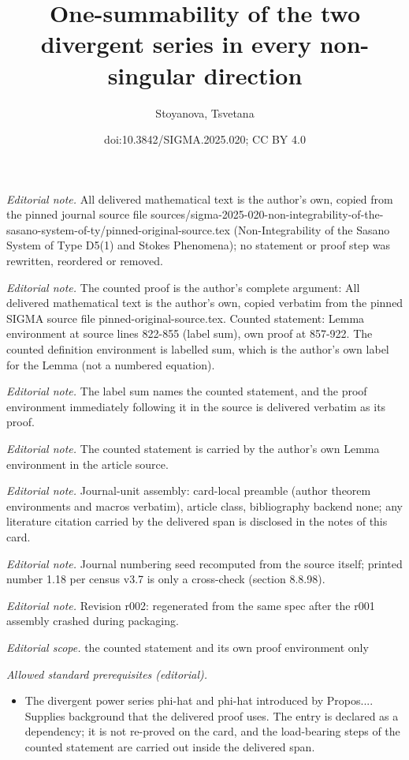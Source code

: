 \documentclass[10pt,a4paper]{article}
\title{One-summability of the two divergent series in every non-singular direction}
\author{Stoyanova, Tsvetana}
\date{doi:10.3842/SIGMA.2025.020; CC BY 4.0}
\numberwithin{equation}{section}
\begin{document}
\maketitle
\setcounter{section}{1}
\setcounter{Theorem}{17}
\noindent\textit{Editorial note.} All delivered mathematical text is the author's own, copied from the pinned journal source file sources/sigma-2025-020-non-integrability-of-the-sasano-system-of-ty/pinned-original-source.tex (Non-Integrability of the Sasano System of Type D5(1) and Stokes Phenomena); no statement or proof step was rewritten, reordered or removed.\par\medskip
\noindent\textit{Editorial note.} The counted proof is the author's complete argument: All delivered mathematical text is the author's own, copied verbatim from the pinned SIGMA source file pinned-original-source.tex. Counted statement: Lemma environment at source lines 822-855 (label sum), own proof at 857-922. The counted definition environment is labelled sum, which is the author's own label for the Lemma (not a numbered equation).\par\medskip
\noindent\textit{Editorial note.} The label sum names the counted statement, and the proof environment immediately following it in the source is delivered verbatim as its proof.\par\medskip
\noindent\textit{Editorial note.} The counted statement is carried by the author's own Lemma environment in the article source.\par\medskip
\noindent\textit{Editorial note.} Journal-unit assembly: card-local preamble (author theorem environments and macros verbatim), article class, bibliography backend none; any literature citation carried by the delivered span is disclosed in the notes of this card.\par\medskip
\noindent\textit{Editorial note.} Journal numbering seed recomputed from the source itself; printed number 1.18 per census v3.7 is only a cross-check (section 8.8.98).\par\medskip
\noindent\textit{Editorial note.} Revision r002: regenerated from the same spec after the r001 assembly crashed during packaging.\par\medskip
\noindent\textit{Editorial scope.} the counted statement and its own proof environment only\par\medskip
\noindent\textit{Allowed standard prerequisites (editorial).}\begin{itemize}
\item The divergent power series phi-hat and phi-hat introduced by Propos.... Supplies background that the delivered proof uses. The entry is declared as a dependency; it is not re-proved on the card, and the load-bearing steps of the counted statement are carried out inside the delivered span.
\end{itemize}\medskip
\end{document}

